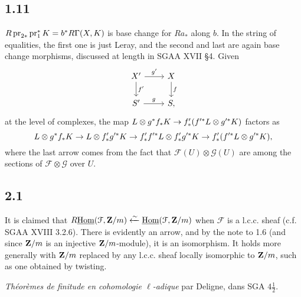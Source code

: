 \documentclass[deligne.tex]{subfiles}
\begin{document}
	\subsection*{1.11} $R\operatorname{pr}_{2*}\operatorname{pr}_1^*K=b^*R\Gamma(X,K)$ is base change
	for $Ra_*$ along $b$. In the string of equalities, the first one is
	just Leray, and the second and last are again base change morphisms,
	discussed at length in SGAA XVII \S4. Given
	\begin{equation*}\begin{tikzcd}
		X'\arrow[r,"g'"]\arrow[d,"f'"]&X\arrow[d,"f"] \\
		S'\arrow[r,"g"]&S,
	\end{tikzcd}\end{equation*}
	at the level of complexes, the map
	$L\otimes g^*f_*K\rightarrow f'_*(f'^*L\otimes g'^*K)$ factors as
	\begin{equation*}
		L\otimes g^*f_*K\rightarrow L\otimes f'_*g'^*K\rightarrow f'_*f'^*L\otimes f'_*g'^*K
		\rightarrow f'_*(f'^*L\otimes g'^*K),
	\end{equation*}
	where the last arrow comes from the fact that
	$\mathscr F(U)\otimes\mathscr G(U)$ are among the sections of
	$\mathscr F\otimes \mathscr G$ over $U$.
	
	\subsection*{2.1}\label{thfin:2.1} It is claimed that
	$R\underline{\operatorname{Hom}}(\mathcal F,\mathbf Z/m)\xleftarrow{\sim}\underline{\operatorname{Hom}}(\mathcal F,\mathbf Z/m)$
	when $\mathcal F$ is a l.c.c. sheaf (c.f. SGAA XVIII 3.2.6).
	There is evidently an arrow, and by the note to 1.6 (and since $\mathbf{Z}/m$ is
	an injective $\mathbf{Z}/m$-module), it is an isomorphism.
	It holds more generally with $\mathbf{Z}/m$ replaced by any l.c.c. sheaf locally
	isomorphic to $\mathbf{Z}/m$, such as one obtained by twisting.

\begin{thebibliography}{Th. finitude}
	 \textit{Théorèmes de finitude en cohomologie $\ell$-adique} par Deligne,
	dans SGA $4\frac12$.
\end{thebibliography}
\end{document}
